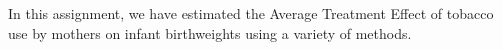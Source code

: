 In this assignment, we have estimated the Average Treatment Effect of tobacco use by mothers on infant birthweights using a variety of methods. 